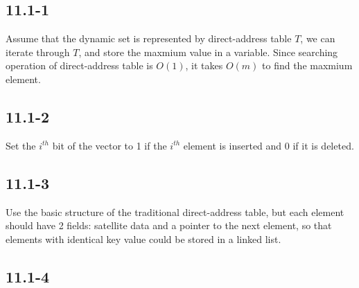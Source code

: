 \subsection{11.1-1}
	Assume that the dynamic set is represented by 
	direct-address table $T$, we can iterate through
	$T$, and store the maxmium value in a variable.
	Since searching operation of direct-address table
	is $O(1)$, it takes $O(m)$ to find the maxmium 
	element.
\subsection{11.1-2}
	Set the $i^{th}$ bit of the vector to 1 if the
	$i^{th}$ element is inserted and 0 if it is 
	deleted.
\subsection{11.1-3}
	Use the basic structure of the traditional
	direct-address table, but each element should
	have 2 fields: satellite data and a 
	pointer to the next element, so that elements 
	with identical key value could be stored in a
	linked list.
\subsection{11.1-4}

